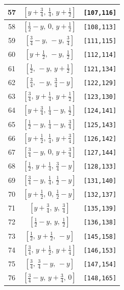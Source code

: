 \documentclass[fleqn,8pt]{jsarticle}
\begin{document}
\begin{longtable}{ccc}
57 & $\left[ y + \frac{3}{4},\, \frac{1}{4},\, y + \frac{1}{2} \right]$ & {\tt [107,116]} \\ \hline
58 & $\left[ \frac{1}{2} - y,\, 0,\, y + \frac{1}{2} \right]$ & {\tt [108,113]} \\ \hline
59 & $\left[ \frac{3}{4} - y,\, - y,\, \frac{3}{4} \right]$ & {\tt [111,115]} \\ \hline
60 & $\left[ y + \frac{1}{2},\, - y,\, \frac{1}{2} \right]$ & {\tt [112,114]} \\ \hline
61 & $\left[ \frac{1}{2},\, - y,\, y + \frac{1}{2} \right]$ & {\tt [121,134]} \\ \hline
62 & $\left[ \frac{3}{4},\, - y,\, \frac{3}{4} - y \right]$ & {\tt [122,129]} \\ \hline
63 & $\left[ \frac{3}{4},\, y + \frac{1}{4},\, y + \frac{1}{2} \right]$ & {\tt [123,130]} \\ \hline
64 & $\left[ y + \frac{3}{4},\, \frac{1}{4} - y,\, \frac{1}{2} \right]$ & {\tt [124,141]} \\ \hline
65 & $\left[ \frac{1}{2} - y,\, \frac{1}{4} - y,\, \frac{3}{4} \right]$ & {\tt [125,143]} \\ \hline
66 & $\left[ y + \frac{1}{2},\, \frac{1}{4},\, y + \frac{3}{4} \right]$ & {\tt [126,142]} \\ \hline
67 & $\left[ \frac{3}{4} - y,\, 0,\, y + \frac{3}{4} \right]$ & {\tt [127,144]} \\ \hline
68 & $\left[ \frac{1}{2},\, y + \frac{1}{4},\, \frac{3}{4} - y \right]$ & {\tt [128,133]} \\ \hline
69 & $\left[ \frac{3}{4} - y,\, \frac{1}{4},\, \frac{1}{2} - y \right]$ & {\tt [131,140]} \\ \hline
70 & $\left[ y + \frac{1}{2},\, 0,\, \frac{1}{2} - y \right]$ & {\tt [132,137]} \\ \hline
71 & $\left[ y + \frac{3}{4},\, y,\, \frac{3}{4} \right]$ & {\tt [135,139]} \\ \hline
72 & $\left[ \frac{1}{2} - y,\, y,\, \frac{1}{2} \right]$ & {\tt [136,138]} \\ \hline
73 & $\left[ \frac{1}{2},\, y + \frac{1}{2},\, - y \right]$ & {\tt [145,158]} \\ \hline
74 & $\left[ \frac{3}{4},\, y + \frac{1}{2},\, y + \frac{1}{4} \right]$ & {\tt [146,153]} \\ \hline
75 & $\left[ \frac{3}{4},\, \frac{3}{4} - y,\, - y \right]$ & {\tt [147,154]} \\ \hline
76 & $\left[ \frac{3}{4} - y,\, y + \frac{3}{4},\, 0 \right]$ & {\tt [148,165]} \\ \hline

\end{longtable}
\end{document}
